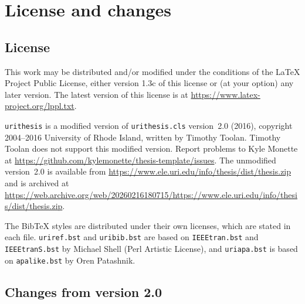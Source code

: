 \documentclass[11pt]{article}
\newcommand\cls{\texttt{urithesis}}
\newcommand\file[1]{\texttt{#1}}
\begin{document}
\section{License and changes}\label{sec:license}

\subsection{License}

This work may be distributed and/or modified under the conditions of the
\LaTeX{} Project Public License, either version 1.3c of this license or (at
your option) any later version.
The latest version of this license is at
\url{https://www.latex-project.org/lppl.txt}.

\cls{} is a modified version of \file{urithesis.cls} version~2.0 (2016),
copyright 2004--2016 University of Rhode Island, written by Timothy Toolan.
Timothy Toolan does not support this modified version.
Report problems to Kyle Monette at
\url{https://github.com/kylemonette/thesis-template/issues}.
The unmodified version~2.0 is available from
\url{https://www.ele.uri.edu/info/thesis/dist/thesis.zip}
and is archived at
\url{https://web.archive.org/web/20260216180715/https://www.ele.uri.edu/info/thesis/dist/thesis.zip}.

The Bib\TeX{} styles are distributed under their own licenses, which are
stated in each file.
\file{uriref.bst} and \file{uribib.bst} are based on \texttt{IEEEtran.bst} and
\texttt{IEEEtranS.bst} by Michael Shell (Perl Artistic License), and
\file{uriapa.bst} is based on \texttt{apalike.bst} by Oren Patashnik.

\subsection{Changes from version 2.0}
\end{document}

